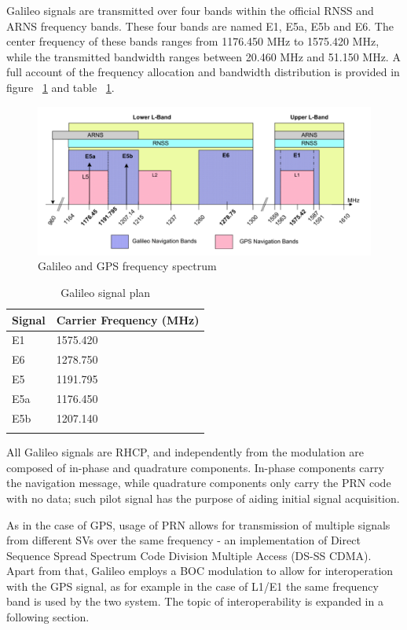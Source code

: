 \vspace{\baselineskip}

Galileo signals are transmitted over four bands within the official RNSS and
ARNS frequency bands. These four bands are named E1, E5a, E5b and E6. The center
frequency of these bands ranges from \num{1176.450} \si{MHz} to \num{1575.420}
\si{MHz}, while the transmitted bandwidth ranges between \num{20.460} \si{MHz}
and \num{51.150} \si{MHz}. A full account of the frequency allocation and
bandwidth distribution is provided in figure ~\ref{fig:galileo_frequencies} and
table ~\ref{table:galileo_signals}.

\begin{figure}[h!]
  \includegraphics[width=\linewidth]{figures/galileo_signal_plan.png}
  \caption{Galileo and GPS frequency spectrum}
  \label{fig:galileo_frequencies}
\end{figure}

\begin{longtable}[]{@{}ll@{}}
  \toprule
  Signal & Carrier Frequency (MHz)\tabularnewline
  \midrule
  \endhead
  E1 & 1575.420\tabularnewline
  E6 & 1278.750\tabularnewline
  E5 & 1191.795\tabularnewline
  E5a & 1176.450\tabularnewline
  E5b & 1207.140\tabularnewline
  \bottomrule
  \caption{Galileo signal plan}
  \label{table:galileo_signals}
\end{longtable}

All Galileo signals are RHCP, and independently from the modulation are composed
of in-phase and quadrature components. In-phase components carry the navigation
message, while quadrature components only carry the PRN code with no data; such
pilot signal has the purpose of aiding initial signal acquisition.

As in the case of GPS, usage of PRN allows for transmission of multiple signals
from different SVs over the same frequency - an implementation of Direct
Sequence Spread Spectrum Code Division Multiple Access (DS-SS CDMA). Apart from
that, Galileo employs a BOC modulation to allow for interoperation with the GPS
signal, as for example in the case of L1/E1 the same frequency band is used by
the two system. The topic of interoperability is expanded in a following
section.


